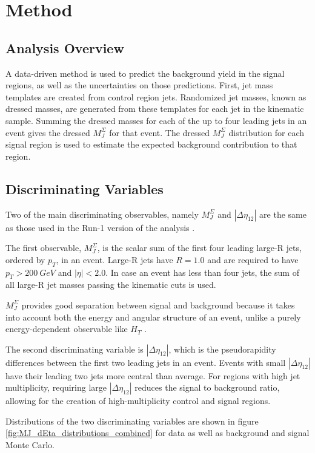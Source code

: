 \chapter{Method} \label{chapter-method}

\section{Analysis Overview}
A data-driven method is used to predict the background yield in the
signal regions, as well as the uncertainties on those
predictions. First, jet mass templates are created from control region jets.
Randomized jet masses, known as dressed masses, are generated from
these templates for each jet in the kinematic sample. Summing the
dressed masses for each of the up to four leading jets in an event gives the
dressed $M_{J}^{\Sigma}$ for that event. The dressed $M_{J}^{\Sigma}$
distribution for each signal region is
used to estimate the expected background contribution to that region.

\section{Discriminating Variables}
Two of the main discriminating observables, namely $M_J^{\Sigma}$ and
$|\Delta\eta_{12}|$ are the same as those used in the Run-1 version of
the analysis \cite{run1-multijet}. 

The first observable,
$M_J^{\Sigma}$, is the scalar sum of the first four leading large-R jets,
ordered by $p_{T}$, in an event. Large-R jets have $R=1.0$ and are
required to have $p_{T} > 200~GeV$ and $|\eta|<2.0$. In case an event has less than four
jets, the sum of all large-R jet masses passing the kinematic cuts is
used.

$M_{J}^{\Sigma}$ provides good separation between signal and
background because it takes into
account both the energy and angular structure of an event, unlike a
purely energy-dependent observable like $H_{T}$ \cite{hook-mj,
  elhedri-mj}.

The second discriminating variable is $|\Delta \eta_{12}|$, which is
the pseudorapidity differences between the first two leading jets in
an event. Events with small $|\Delta \eta_{12}|$ have their leading
two jets more central than average. For regions with high jet
multiplicity, requiring large $|\Delta \eta_{12}|$ reduces the signal
to background ratio, allowing for the creation of high-multiplicity
control and signal regions.

Distributions of the two discriminating variables are shown in figure
\ref{fig:MJ_dEta_distributions_combined} for data as well as
background and signal Monte Carlo.

